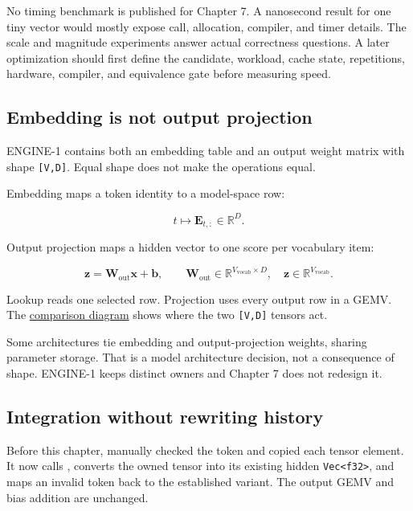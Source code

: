 \documentclass[
  10pt,
]{article}
\begin{document}
No timing benchmark is published for Chapter 7. A nanosecond result for
one tiny vector would mostly expose call, allocation, compiler, and
timer details. The scale and magnitude experiments answer actual
correctness questions. A later optimization should first define the
candidate, workload, cache state, repetitions, hardware, compiler, and
equivalence gate before measuring speed.

\subsection{Embedding is not output
projection}\label{embedding-is-not-output-projection}

ENGINE-1 contains both an embedding table and an output weight matrix
with shape \texttt{{[}V,D{]}}. Equal shape does not make the operations
equal.

Embedding maps a token identity to a model-space row:

\[
t\longmapsto\mathbf{E}_{t,:}\in\mathbb{R}^{D}.
\]

Output projection maps a hidden vector to one score per vocabulary item:

\[
\mathbf{z}=\mathbf{W}_{\mathrm{out}}\mathbf{x}+\mathbf{b},
\qquad
\mathbf{W}_{\mathrm{out}}\in
\mathbb{R}^{V_{\mathrm{vocab}}\times D},
\quad
\mathbf{z}\in\mathbb{R}^{V_{\mathrm{vocab}}}.
\]

Lookup reads one selected row. Projection uses every output row in a
GEMV. The
\href{https://github.com/hermonai/inside-the-llm-engine/blob/astra-visual-rewrite/diagrams/transformer/embedding-vs-output-projection.txt}{comparison
diagram} shows where the two \texttt{{[}V,D{]}} tensors act.

Some architectures tie embedding and output-projection weights, sharing
parameter storage. That is a model architecture decision, not a
consequence of shape. ENGINE-1 keeps distinct owners and Chapter 7 does
not redesign it.

\subsection{Integration without rewriting
history}\label{integration-without-rewriting-history}

Before this chapter,
\texttt{} manually checked
the token and copied each tensor element. It now calls
\texttt{}, converts the owned
tensor into its existing hidden
\texttt{Vec\textless{}f32\textgreater{}}, and maps an invalid token back
to the established \texttt{}
variant. The output GEMV and bias addition are unchanged.
\end{document}
